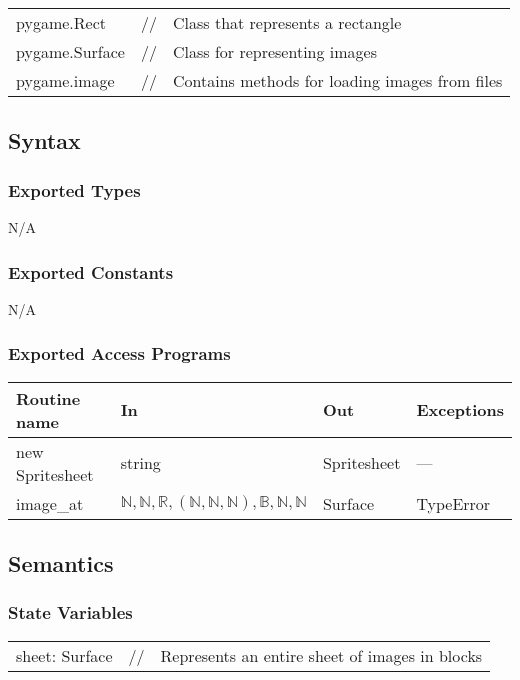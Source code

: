 \documentclass[12pt]{article}
\begin{document}
\begin{tabular}{lll}
    pygame.Rect & // & Class that represents a rectangle\\
    pygame.Surface & // & Class for representing images\\
    pygame.image & // & Contains methods for loading images from files
\end{tabular}

\subsection* {Syntax}

\subsubsection* {Exported Types}

N/A

\subsubsection* {Exported Constants}

N/A


\subsubsection* {Exported Access Programs}

\begin{tabular}{| l | l | l | p{5cm} |}
\hline
\textbf{Routine name} & \textbf{In} & \textbf{Out} & \textbf{Exceptions}\\
\hline
new Spritesheet & string & Spritesheet & ---\\
\hline
image\_at & $\mathbb{N}, \mathbb{N}, \mathbb{R}, (\mathbb{N}, \mathbb{N}, \mathbb{N}), \mathbb{B}, \mathbb{N}, \mathbb{N}$ & Surface & TypeError\\
\hline
\end{tabular}

\subsection* {Semantics}

\subsubsection* {State Variables}

\begin{tabular}{lll}
    sheet: Surface & // & Represents an entire sheet of images in blocks\\ 
\end{tabular}
\end{document}
